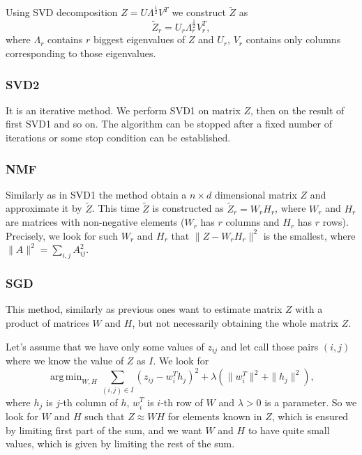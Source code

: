 \documentclass[10pt]{amsart}
\DeclareMathOperator*{\argmin}{arg\,min}
\begin{document}
Using SVD decomposition $Z = U \Lambda^{\frac{1}{2}} V^T$ we construct $\tilde{Z}$ as
\[\tilde{Z}_r = U_r \Lambda_r^{\frac{1}{2}}V_r^T,\]
where $\Lambda_r$ contains $r$ biggest eigenvalues of $Z$ and $U_r$, $V_r$ contains only columns corresponding to those eigenvalues.

\subsubsection*{SVD2}

It is an iterative method.
We perform SVD1 on matrix $Z$, then on the result of first SVD1 and so on.
The algorithm can be stopped after a fixed number of iterations or some stop condition can be established.


\subsubsection*{NMF}

Similarly as in SVD1 the method obtain a $n \times d$ dimensional matrix $Z$ and approximate it by $\tilde{Z}$.
This time $\tilde{Z}$ is constructed as $\tilde{Z}_r = W_r H_r $, where $W_r$ and $H_r$ are matrices with non-negative elements ($W_r$ has $r$ columns and $H_r$ has $r$ rows).
Precisely, we look for such $W_r$ and $H_r$ that $\|Z - W_r H_r \|^2$ is the smallest, where $\|A\|^2 = \sum_{i, j} A_{ij}^2$.

\subsubsection*{SGD}

This method, similarly as previous ones want to estimate matrix $Z$ with a product of matrices
$W$ and $H$, but not necessarily obtaining the whole matrix $Z$.

Let's assume that we have only some values of $z_{ij}$ and let call those pairs $(i,j)$ where we know the value of $Z$ as $I$.
We look for
\[\argmin_{W, H} \sum_{(i,j)\in I} (z_{ij} - w_i^T h_j)^2 + \lambda(\|w_i^T\|^2 + \|h_j\|^2),\]
where $h_j$ is $j$-th column of $h$, $w_i^T$ is $i$-th row of $W$ and $\lambda > 0$ is a parameter.
So we look for $W$ and $H$ such that $Z \approx WH$ for elements known in $Z$, which is ensured by limiting first part of the sum, and
we want $W$ and $H$ to have quite small values, which is given by limiting the rest of the sum.
\end{document}
